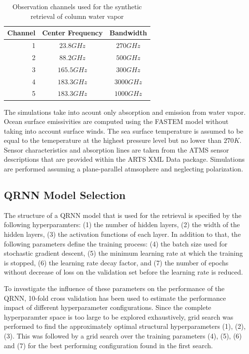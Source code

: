 \documentclass[journal abbreviation, manuscript]{copernicus}
\begin{document}
\begin{table}[hbpt]
\centering
\begin{tabular}{|r|c|c|}
    \hline
    Channel & Center Frequency           & Bandwidth                \\ 
    \hline
                  1 & $23.8 \unit{GHz}$ & $270 \unit{GHz}$ \\
                  2 & $88.2 \unit{GHz}$ & $500 \unit{GHz}$ \\
                  3 & $165.5\unit{GHz}$ & $300 \unit{GHz}$ \\
                  4 & $183.3\unit{GHz}$ & $3000\unit{GHz}$ \\
                  5 & $183.3\unit{GHz}$ & $1000\unit{GHz}$ \\
    \hline
\end{tabular}
\caption{Observation channels used for the synthetic retrieval of column water vapor}
\label{tab:channels}
\end{table}

   The simulations take into acount only absorption and emission from water
   vapor. Ocean surface emissivities are computed using the FASTEM \cite{fastem}
   model without taking into account surface winds. The sea surface temperature
   is assumed to be equal to the temeperature at the highest pressure level but
   no lower than $270\unit{K}$. Sensor characteristics and absorption
   lines are taken from the ATMS sensor descriptions that are provided within
   the ARTS XML Data package. Simulations are performed assuming a
   plane-parallel atmsophere and neglecting polarization.

\subsection{QRNN Model Selection}

 The structure of a QRNN model that is used for the retrieval is specified by the
 following hyperparamters: (1) the number of hidden layers, (2) the width of
 the hidden layers, (3) the activation functions of each layer. In addition to
 that, the following parameters define the training process: (4) the batch size
 used for stochastic gradient descent, (5) the minimum learning rate at which
 the training is stopped, (6) the learning rate decay factor, and (7) the
 number of epochs without decrease of loss on the validation set before
 the learning rate is reduced.

  To investigate the influence of these parameters on the performance of the
  QRNN, 10-fold cross validation has been used to estimate the performance
  impact of different hyperparameter configurations. Since the complete
  hyperparamter space is too large to be explored exhaustively, grid search was
  performed to find the approximately optimal structural hyperparameters (1),
  (2), (3). This was followed by a grid search over the training parameters
  (4), (5), (6) and (7) for the best performing configuration found in the
  first search.
\end{document}
